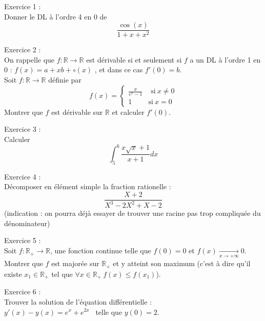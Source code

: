 \documentclass{article}
\begin{document}
\renewcommand{\labelitemi}{$\circ$}

\large{Exercice 1} : \\
Donner le DL {\`a} l'ordre 4 en 0 de \\
$$\frac{\cos (x)}{1+x+x^2}$$

\vspace{5mm}

\large{Exercice 2} : \\
On rappelle que $f : \mathbb{R} \rightarrow \mathbb{R}$ est d{\'e}rivable
si et seulement si $f$ a un DL {\`a} l'ordre 1 en 0 : $f(x) = a +xb +\circ
(x)$ , et dans ce cas $f'(0)=b$.\\
Soit $f : \mathbb{R} \rightarrow \mathbb{R}$ d{\'e}finie par 
$$f(x) = \left\{ 
\begin{array}{ll}
\frac{x}{e^x-1} & \text{ si} \ x \neq 0 \\
1 & \text{si} \ x=0
\end{array}\right. $$
Montrer que $f$ est d{\'e}rivable sur $\mathbb{R}$ et calculer $f'(0)$.


\vspace{5mm}

\large{Exercice 3} : \\
Calculer 
$$\int_5^6 \frac{x\sqrt{x} +1}{x+1}dx$$



\vspace{5mm}

\large{Exercice 4} : \\
D{\'e}composer en {\'e}l{\'e}ment simple la fraction rationelle :
$$\frac{X+2}{X^3-2X^2+X-2}$$
(indication : on pourra d{\'e}j{\`a} essayer de trouver une racine pas trop
compliqu{\'e}e du d{\'e}nominateur)

\vspace{5mm}

\large{Exercice 5} :\\
Soit $f : \mathbb{R}_+ \rightarrow \mathbb{R}$, une fonction
continue telle que $f(0)=0$ et
$f(x) \xrightarrow[x \to +  \infty]{} 0$. Montrer que $f$ est major{\'e}e sur
$\mathbb{R}_+$ et y atteint son maximum (c'est {\`a} dire qu'il existe
$x_1 \in \mathbb{R}_+$ tel que $\forall x \in \mathbb{R}_+ \ f(x)
\leq f(x_1)$).

\vspace{5mm}

\large{Exercice 6} : \\
Trouver la solution de l'{\'e}quation diff{\'e}rentielle :\\
$y'(x) - y(x) =e^x+e^{2x}$ \ telle que $y(0)=2$.



\end{document}
